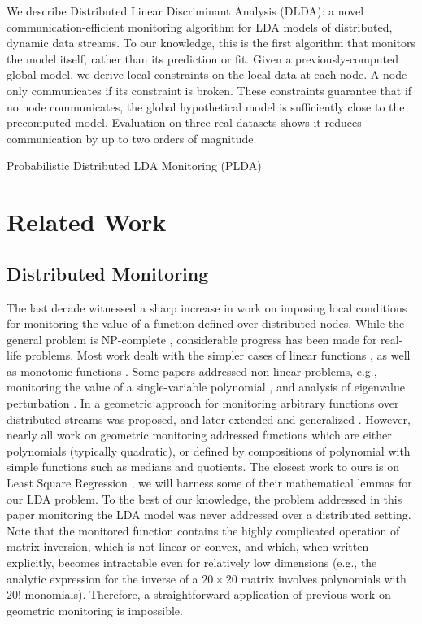 \documentclass[11pt,twocolumn,varwidth=true,a4paper,fleqn]{article}
\begin{document}
We describe Distributed Linear Discriminant Analysis (DLDA): a novel
communication-efficient monitoring algorithm for LDA models of distributed, dynamic data streams. 
To our knowledge, this is the first algorithm that monitors the model itself, 
rather than its prediction or fit. Given a previously-computed global model, 
we derive local constraints on the local data at each node. A node only communicates
if its constraint is broken. These constraints guarantee that
if no node communicates, the global hypothetical model is
sufficiently close to the precomputed model.
Evaluation on three real datasets shows it reduces communication by up to two orders of
magnitude. 

Probabilistic Distributed LDA Monitoring (PLDA)

\section{Related Work}
\subsection{Distributed Monitoring}
The last decade witnessed a sharp increase in work on imposing local conditions for monitoring the value of a function
defined over distributed nodes. While the general problem is NP-complete
\cite{keren2014geometric}, considerable progress has been made for real-life problems. Most work dealt with the simpler cases of
linear functions \cite{keralapura2006communication, kashyap2008efficient}, as well as monotonic
functions \cite{michel2005klee}.
Some papers addressed non-linear problems, e.g., monitoring
the value of a single-variable polynomial \cite{shah2008handling}, and analysis
of eigenvalue perturbation \cite{huang2007communication}. 
In \cite{sharfman2007geometric} a geometric approach for monitoring arbitrary functions over distributed
streams was proposed, and later extended and generalized
\cite{keren2012shape,lazerson2015monitoring}. However, nearly all work on geometric monitoring addressed
functions which are either polynomials (typically quadratic), or defined by
compositions of polynomial with simple functions such as medians and quotients. 
The closest work to ours is on Least Square Regression
\cite{gabel2015monitoring}, we will harness some of their mathematical lemmas
for our LDA problem. To the best of our knowledge, the problem addressed in this
paper monitoring the LDA model was never addressed over a distributed setting. Note
that the monitored function contains the highly complicated
operation of matrix inversion, which is not linear or convex,
and which, when written explicitly, becomes intractable even
for relatively low dimensions (e.g., the analytic expression
for the inverse of a $20 \times 20$ matrix involves polynomials with
$20!$ monomials). Therefore, a straightforward application of
previous work on geometric monitoring is impossible.
\end{document}
